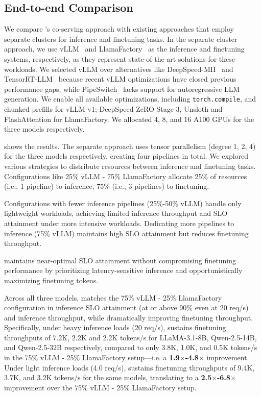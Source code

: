 \subsection{End-to-end Comparison}

We compare \sys's co-serving approach with existing approaches that employ separate clusters for inference and finetuning tasks. In the separate cluster approach, we use vLLM~\cite{10.1145/3600006.3613165} and LlamaFactory~\cite{llamafactory} as the inference and finetuning systems, respectively, as they represent state-of-the-art solutions for these workloads. We selected vLLM over alternatives like DeepSpeed-MII~\cite{deepspeed-mii} and TensorRT-LLM~\cite{tensorrt-llm} because recent vLLM optimizations have closed previous performance gaps, while PipeSwitch~\cite{bai2020pipeswitch} lacks support for autoregressive LLM generation. We enable all available optimizations, including \texttt{torch.compile}, and chunked prefills for vLLM v1; DeepSpeed ZeRO Stage 3, Unsloth and FlashAttention for LlamaFactory.
We allocated 4, 8, and 16 A100 GPUs for the three models respectively.

 shows the results. The separate approach uses tensor parallelism (degree 1, 2, 4) for the three models respectively, creating four pipelines in total. We explored various strategies to distribute resources between inference and finetuning tasks. Configurations like 25\% vLLM - 75\% LlamaFactory allocate 25\% of resources (i.e., 1 pipeline) to inference, 75\% (i.e., 3 pipelines) to finetuning.

Configurations with fewer inference pipelines (25\%-50\% vLLM) handle only lightweight workloads, achieving limited inference throughput and SLO attainment under more intensive workloads. Dedicating more pipelines to inference (75\% vLLM) maintains high SLO attainment but reduces finetuning throughput.

\Sys maintains near-optimal SLO attainment without compromising finetuning performance by prioritizing latency-sensitive inference and opportunistically maximizing finetuning tokens.

Across all three models, \sys matches the 75\% vLLM - 25\% LlamaFactory configuration in inference SLO attainment (at or above 90\% even at 20 req/s) and inference throughput, while dramatically improving finetuning throughput. Specifically, under heavy inference loads (20 req/s), \sys sustains finetuning throughputs of 7.2K, 2.2K and 2.2K tokens/s for LLaMA-3.1-8B, Qwen-2.5-14B, and Qwen-2.5-32B respectively, compared to only 3.8K, 1.0K, and 0.5K tokens/s in the 75\% vLLM - 25\% LlamaFactory setup—i.e. a \textbf{1.9$\times$-4.8$\times$} improvement. Under light inference loads (4.0 req/s), \sys sustains finetuning throughputs of 9.4K, 3.7K, and 3.2K tokens/s for the same models, translating to a \textbf{2.5$\times$-6.8$\times$} improvement over the 75\% vLLM - 25\% LlamaFactory setup.


